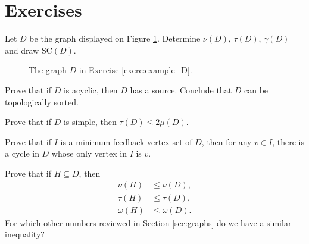 \documentclass[a4paper, 11pt]{book}
\numberwithin{equation}{section}
\theoremstyle{plain}
\newcommand{\feedback}{\tau}
\newcommand{\girth}{\gamma}
\newcommand{\packing}{\nu}
\newcommand{\clique}{\omega}
\newcommand{\strongComponentGraph}{\mathrm{SC}}
\renewcommand{\(}{\ldbrack}
\renewcommand{\)}{\rdbrack}
\begin{document}
\section{Exercises} \label{sec:exercises_mathematical_background}


\begin{exercises}


\item \label{exerc:example_D} Let $D$ be the graph displayed on Figure \ref{fig:example_D}. Determine $\packing(D)$, $\tau(D)$, $\girth(D)$ and draw $\strongComponentGraph(D)$.

\begin{figure}
\centering
{}
\caption{The graph $D$ in Exercise \ref{exerc:example_D}.} \label{fig:example_D}
\end{figure}




\item Prove that if $D$ is acyclic, then $D$ has a source. Conclude that $D$ can be topologically sorted.

\item Prove that if $D$ is simple, then $\tau(D) \le 2 \mu(D)$.

\item Prove that if $I$ is a minimum feedback vertex set of $D$, then for any $v \in I$, there is a cycle in $D$ whose only vertex in $I$ is $v$.

\item Prove that if $H \subseteq D$, then
\begin{align*}
	\packing(H) &\le \packing(D),\\
	\feedback(H) &\le \feedback(D),\\
	\clique(H) &\le \clique(D).
\end{align*}
For which other numbers reviewed in Section \ref{sec:graphs} do we have a similar inequality?


\end{exercises}
\end{document}
